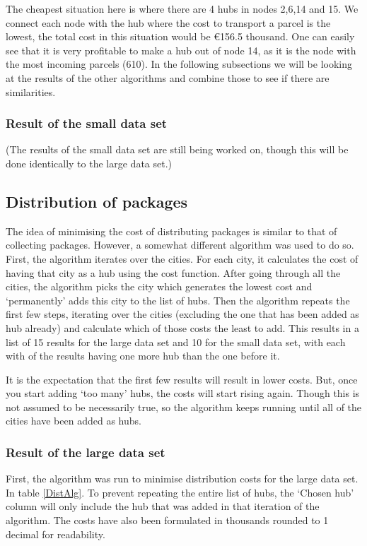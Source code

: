 \documentclass{article}
\begin{document}
The cheapest situation here is where there are 4 hubs in nodes 2,6,14 and 15. We connect each node with the hub where the cost to transport a parcel is the lowest, the total cost in this situation would be €156.5 thousand. One can easily see that it is very profitable to make a hub out of node 14, as it is the node with the most incoming parcels (610). In the following subsections we will be looking at the results of the other algorithms and combine those to see if there are similarities.
\subsubsection{Result of the small data set}
(The results of the small data set are still being worked on, though this will be done identically to the large data set.)

\subsection{Distribution of packages}
\label{Distribution}
The idea of minimising the cost of distributing packages is similar to that of collecting packages. However, a somewhat different algorithm was used to do so. First, the algorithm iterates over the cities. For each city, it calculates the cost of having that city as a hub using the cost function. After going through all the cities, the algorithm picks the city which generates the lowest cost and `permanently' adds this city to the list of hubs. Then the algorithm repeats the first few steps, iterating over the cities (excluding the one that has been added as hub already) and calculate which of those costs the least to add. This results in a list of 15 results for the large data set and 10 for the small data set, with each with of the results having one more hub than the one before it. 

It is the expectation that the first few results will result in lower costs. But, once you start adding `too many' hubs, the costs will start rising again. Though this is not assumed to be necessarily true, so the algorithm keeps running until all of the cities have been added as hubs. 

\subsubsection{Result of the large data set}
First, the algorithm was run to minimise distribution costs for the large data set. In table \ref{DistAlg}. To prevent repeating the entire list of hubs, the `Chosen hub' column will only include the hub that was added in that iteration of the algorithm. The costs have also been formulated in thousands rounded to 1 decimal for readability.
\end{document}
